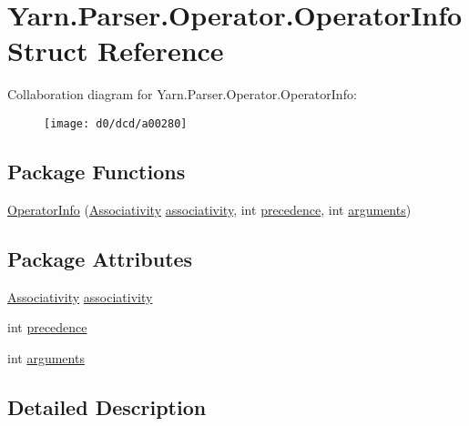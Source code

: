 \hypertarget{a00059}{\section{Yarn.\-Parser.\-Operator.\-Operator\-Info Struct Reference}
\label{a00059}
}


Collaboration diagram for Yarn.\-Parser.\-Operator.\-Operator\-Info\-:
\nopagebreak
\begin{figure}[H]
\begin{center}
\leavevmode
\texttt{[image: d0/dcd/a00280]}
\end{center}
\end{figure}
\subsection*{Package Functions}
\begin{DoxyCompactItemize}
\item 
\hyperlink{a00059_a25faca62235c9f8542e4a071ba8ebc0b}{Operator\-Info} (\hyperlink{a00058_a83fa1b8db0e6678006920812b6f33f62}{Associativity} \hyperlink{a00059_accba40a72d9709ca3c18810b8661afe3}{associativity}, int \hyperlink{a00059_a0b2921d7b863e268d33aa15213395093}{precedence}, int \hyperlink{a00059_a0758c6f7dac4b205f616b43b1af95b95}{arguments})
\end{DoxyCompactItemize}
\subsection*{Package Attributes}
\begin{DoxyCompactItemize}
\item 
\hyperlink{a00058_a83fa1b8db0e6678006920812b6f33f62}{Associativity} \hyperlink{a00059_accba40a72d9709ca3c18810b8661afe3}{associativity}
\item 
int \hyperlink{a00059_a0b2921d7b863e268d33aa15213395093}{precedence}
\item 
int \hyperlink{a00059_a0758c6f7dac4b205f616b43b1af95b95}{arguments}
\end{DoxyCompactItemize}


\subsection{Detailed Description}


